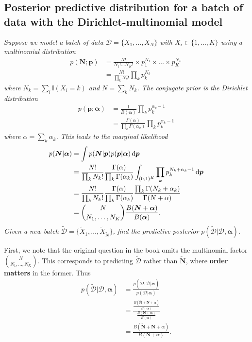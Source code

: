 \subsection{Posterior predictive distribution for a batch of data with the Dirichlet-multinomial model}
\textit{Suppose we model a batch of data $\mathcal{D}=\{X_1,\dots,X_N\}$ with $X_i\in{\{1,\dots,K\}}$ using a multinomial distribution}
\begin{align*}
p(\bm{N}; \bm{p}) &= \frac{N!}{N_1!\dots N_K!} \times p_1^{N_1} \times \dots \times p_K^{N_K}\\
&= \frac{N!}{\prod_k N_k!} \prod_k p_k^{N_k}
\end{align*}
\textit{where $N_k=\sum_i\mathbb{I}(X_i=k)$ and $N=\sum_kN_k$. The conjugate prior is the Dirichlet distribution}
\begin{align*}
p(\bm{p};\bm\alpha) &= \frac{1}{B(\bm\alpha)} \prod_k p_k^{\alpha_k-1}\\
&= \frac{\Gamma(\alpha)}{\prod_k \Gamma(\alpha_k)} \prod_k p_k^{\alpha_k-1}
\end{align*}
\textit{where $\alpha=\sum_k\alpha_k$. This leads to the marginal likelihood}
\begin{align*}
p(\bm{N}|\bm\alpha) &= \int p(\bm{N}|\bm{p}) p(\bm{p}|\bm\alpha) \mathop{}\!\mathrm{d}\bm{p}\\
&= \frac{N!}{\prod_k N_k!} \frac{\Gamma(\alpha)}{\prod_k \Gamma(\alpha_k)} \int_{(0,1)^K} \prod_k p_k^{N_k+\alpha_k-1} \mathop{}\!\mathrm{d}\bm{p}\\
&= \frac{N!}{\prod_k N_k!} \frac{\Gamma(\alpha)}{\prod_k \Gamma(\alpha_k)} \frac{\prod_k \Gamma(N_k+\alpha_k)}{\Gamma(N+\alpha)}\\
&= {N \choose N_1,\dots,N_K} \frac{B(\bm{N}+\bm\alpha)}{B(\bm\alpha)}.
\end{align*}
\textit{Given a new batch $\tilde{\mathcal{D}} = \{\tilde{X}_1,\dots,\tilde{X}_{\tilde{N}}\}$, find the predictive posterior $p(\tilde{\mathcal{D}}|\mathcal{D},\bm\alpha)$.}

First, we note that the original question in the book omits the multinomial factor ${N \choose N_1,\dots,N_K}$. This corresponds to predicting $\tilde{\mathcal{D}}$ rather than $\bm{\tilde{N}}$, where \textbf{order matters} in the former. Thus
\begin{align*}
p(\tilde{\mathcal{D}}|\mathcal{D},\bm\alpha) &= \frac{p(\tilde{\mathcal{D}},\mathcal{D}|\bm\alpha)}{p(\mathcal{D}|\bm\alpha)}\\
&= \frac{\frac{B(\bm{\tilde{N}}+\bm{N}+\bm\alpha)}{B(\bm\alpha)}}{\frac{B(\bm{N}+\bm\alpha)}{B(\bm\alpha)}}\\
&= \frac{B(\mathbf{\tilde{N}}+\mathbf{N}+\bm\alpha)}{B(\mathbf{N}+\bm\alpha)}.
\end{align*}

